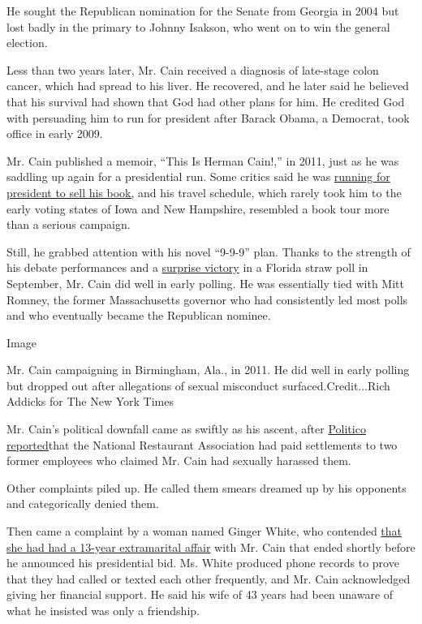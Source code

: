 He sought the Republican nomination for the Senate from Georgia in 2004
but lost badly in the primary to Johnny Isakson, who went on to win the
general election.

Less than two years later, Mr. Cain received a diagnosis of late-stage
colon cancer, which had spread to his liver. He recovered, and he later
said he believed that his survival had shown that God had other plans
for him. He credited God with persuading him to run for president after
Barack Obama, a Democrat, took office in early 2009.

Mr. Cain published a memoir, ``This Is Herman Cain!,'' in 2011, just as
he was saddling up again for a presidential run. Some critics said he
was
\href{https://www.theatlantic.com/politics/archive/2011/10/herman-cain-skips-out-on-early-states-to-push-his-new-book/246260/}{running
for president to sell his book,} and his travel schedule, which rarely
took him to the early voting states of Iowa and New Hampshire, resembled
a book tour more than a serious campaign.

Still, he grabbed attention with his novel ``9-9-9'' plan. Thanks to the
strength of his debate performances and a
\href{http://thecaucus.blogs.nytimes.com/2011/09/24/herman-cain-wins-florida-straw-poll/}{surprise
victory} in a Florida straw poll in September, Mr. Cain did well in
early polling. He was essentially tied with Mitt Romney, the former
Massachusetts governor who had consistently led most polls and who
eventually became the Republican nominee.

Image

Mr. Cain campaigning in Birmingham, Ala., in 2011. He did well in early
polling but dropped out after allegations of sexual misconduct
surfaced.Credit...Rich Addicks for The New York Times

Mr. Cain's political downfall came as swiftly as his ascent, after
\href{https://www.politico.com/story/2011/10/exclusive-2-women-accused-cain-of-inappropriate-behavior-067194}{Politico
reported}that the National Restaurant Association had paid settlements
to two former employees who claimed Mr. Cain had sexually harassed them.

Other complaints piled up. He called them smears dreamed up by his
opponents and categorically denied them.

Then came a complaint by a woman named Ginger White, who contended
\href{https://www.nytimes.com/2011/11/29/us/politics/cain-accused-of-affair-by-ginger-white.html}{that
she had had a 13-year extramarital affair} with Mr. Cain that ended
shortly before he announced his presidential bid. Ms. White produced
phone records to prove that they had called or texted each other
frequently, and Mr. Cain acknowledged giving her financial support. He
said his wife of 43 years had been unaware of what he insisted was only
a friendship.

